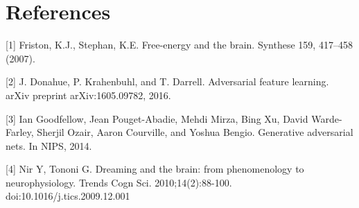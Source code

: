 \documentclass{article}
\begin{document}





\section*{References}

\small

[1] Friston, K.J., Stephan, K.E. Free-energy and the brain. Synthese 159, 417–458 (2007). 

[2] J. Donahue, P. Krahenbuhl, and T. Darrell. Adversarial feature learning. arXiv preprint arXiv:1605.09782, 2016.




[3] Ian Goodfellow, Jean Pouget-Abadie, Mehdi Mirza, Bing Xu, David Warde-Farley, Sherjil Ozair, Aaron Courville, and Yoshua Bengio. Generative adversarial nets. In NIPS, 2014.


[4] Nir Y, Tononi G. Dreaming and the brain: from phenomenology to neurophysiology. Trends Cogn Sci. 2010;14(2):88-100. doi:10.1016/j.tics.2009.12.001



\vspace{2cm}


\end{document}
